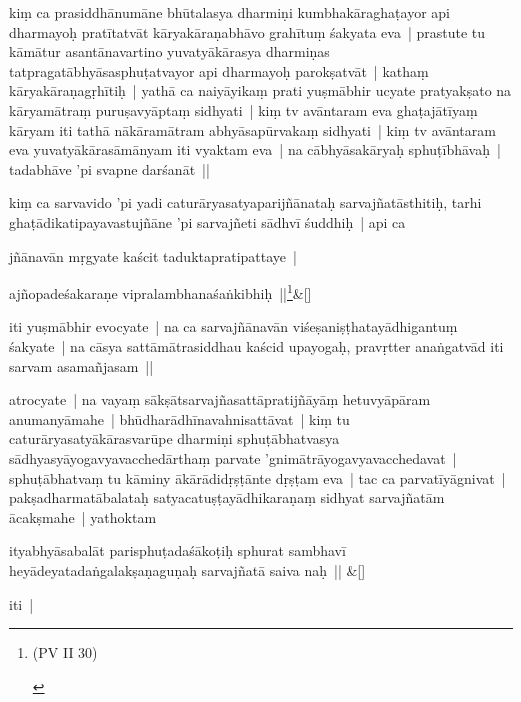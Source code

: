\documentclass[article,a4paper]{memoir}
\begin{document}
	  \pstart kiṃ ca prasiddhā\-numā\-ne bhū\-talasya dharmiṇi kumbhakā\-raghaṭayor api dharmayoḥ pratī\-tatvā\-t kā\-ryakā\-raṇabhā\-vo grahī\-tuṃ śakyata eva | prastute tu kā\-mā\-tur asantā\-navartino yuvatyā\-kā\-rasya dharmiṇas tatpragatā\-bhyā\-sasphuṭatvayor api dharmayoḥ parokṣatvā\-t | kathaṃ kā\-ryakā\-raṇagṛhī\-tiḥ | yathā\- ca naiyā\-yikaṃ prati yuṣmā\-bhir ucyate pratyakṣato na kā\-ryamā\-traṃ puruṣavyā\-ptaṃ sidhyati | kiṃ tv avā\-ntaram eva ghaṭajā\-tī\-yaṃ kā\-ryam iti tathā\- nā\-kā\-ramā\-tram abhyā\-sapū\-rvakaṃ sidhyati | kiṃ tv avā\-ntaram eva yuvatyā\-kā\-rasā\-mā\-nyam iti vyaktam eva | na cā\-bhyā\-sakā\-ryaḥ sphuṭī\-bhā\-vaḥ | tadabhā\-ve 'pi svapne darśanā\-t || 
	\pend
      

	  \pstart kiṃ ca sarvavido 'pi yadi caturā\-ryasatyaparijñā\-nataḥ sarvajñatā\-sthitiḥ, tarhi ghaṭā\-dikatipayavastujñā\-ne 'pi sarvajñeti sā\-dhvī\- śuddhiḥ | api ca 
	\pend
      

	  \pstart jñā\-navā\-n mṛgyate kaścit taduktapratipattaye | 
	\pend
      
	    
	    \stanza[\smallbreak]
ajñopadeśakaraṇe vipralambhanaśaṅkibhiḥ ||\footnote{\begin{english}(PV II 30)\end{english}}\&[\smallbreak]


	

	  \pstart iti yuṣmā\-bhir evocyate | na ca sarvajñā\-navā\-n viśeṣaniṣṭhatayā\-dhigantuṃ śakyate | na cā\-sya sattā\-mā\-trasiddhau kaścid upayogaḥ, pravṛtter anaṅgatvā\-d iti sarvam asamañjasam || 
	\pend
      

	  \pstart atrocyate | na vayaṃ sā\-kṣā\-tsarvajñasattā\-pratijñā\-yā\-ṃ hetuvyā\-pā\-ram anumanyā\-mahe | bhū\-dharā\-dhī\-navahnisattā\-vat | kiṃ tu caturā\-ryasatyā\-kā\-rasvarū\-pe dharmiṇi sphuṭā\-bhatvasya sā\-dhyasyā\-yogavyavacchedā\-rthaṃ parvate 'gnimā\-trā\-yogavyavacchedavat | sphuṭā\-bhatvaṃ tu kā\-miny ā\-kā\-rā\-didṛṣṭā\-nte dṛṣṭam eva | tac ca parvatī\-yā\-gnivat | pakṣadharmatā\-balataḥ satyacatuṣṭayā\-dhikaraṇaṃ sidhyat sarvajñatā\-m ā\-cakṣmahe | yathoktam 
	\pend
      
	    
	    \stanza[\smallbreak]
ityabhyā\-sabalā\-t parisphuṭadaśā\-koṭiḥ sphurat sambhavī\- heyā\-deyatadaṅgalakṣaṇaguṇaḥ sarvajñatā\- saiva naḥ || \&[\smallbreak]


	

	  \pstart iti | 
	\pend
      
\end{document}
